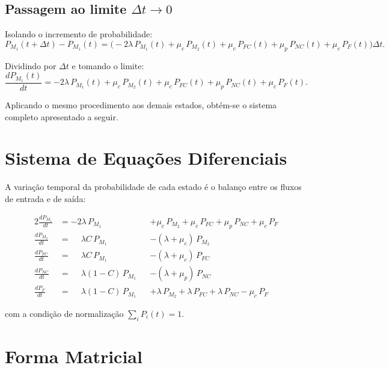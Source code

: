 \documentclass[12pt]{article}
\begin{document}
\subsection*{Passagem ao limite $\Delta t \to 0$}

Isolando o incremento de probabilidade:
\[
P_{M_1}(t + \Delta t) - P_{M_1}(t)
    = \bigl(
        -2\lambda\,P_{M_1}(t)
        + \mu_c\,P_{M_2}(t)
        + \mu_c\,P_{FC}(t)
        + \mu_p\,P_{NC}(t)
        + \mu_c\,P_F(t)
      \bigr)\Delta t.
\]

Dividindo por $\Delta t$ e tomando o limite:
\[
\frac{dP_{M_1}(t)}{dt}
    = -2\lambda\,P_{M_1}(t)
      + \mu_c\,P_{M_2}(t)
      + \mu_c\,P_{FC}(t)
      + \mu_p\,P_{NC}(t)
      + \mu_c\,P_F(t).
\]

Aplicando o mesmo procedimento aos demais estados, obtém-se o sistema
completo apresentado a seguir.

\newpage
\section{Sistema de Equações Diferenciais}

A variação temporal da probabilidade de cada estado é o balanço entre
os fluxos de entrada e de saída:

\begin{alignat*}{2}
\frac{dP_{M_1}}{dt} &= -2\lambda\,P_{M_1}
    &&+ \mu_c\,P_{M_2} + \mu_c\,P_{FC} + \mu_p\,P_{NC} + \mu_c\,P_F \\[4pt]
\frac{dP_{M_2}}{dt} &= \phantom{-}\lambda C\,P_{M_1}
    &&- (\lambda + \mu_c)\,P_{M_2} \\[4pt]
\frac{dP_{FC}}{dt}  &= \phantom{-}\lambda C\,P_{M_1}
    &&- (\lambda + \mu_c)\,P_{FC} \\[4pt]
\frac{dP_{NC}}{dt}  &= \phantom{-}\lambda(1-C)\,P_{M_1}
    &&- (\lambda + \mu_p)\,P_{NC} \\[4pt]
\frac{dP_{F}}{dt}   &= \phantom{-}\lambda(1-C)\,P_{M_1}
    &&+ \lambda\,P_{M_2} + \lambda\,P_{FC} + \lambda\,P_{NC} - \mu_c\,P_F
\end{alignat*}

com a condição de normalização $\sum_i P_i(t) = 1$.

\newpage
\section{Forma Matricial}
\end{document}
